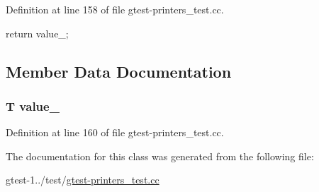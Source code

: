 \-Definition at line 158 of file gtest-\/printers\-\_\-test.\-cc.


\begin{DoxyCode}
{ return value_; }
\end{DoxyCode}


\subsection{\-Member \-Data \-Documentation}
\hypertarget{classfoo_1_1PrintableViaPrintToTemplate_ae496c0f6edafccdab7ef2e2b9d0c7e03}{
\subsubsection[{value\-\_\-}]{\setlength{\rightskip}{0pt plus 5cm}\-T {\bf value\-\_\-}}}\label{d4/d1d/classfoo_1_1PrintableViaPrintToTemplate_ae496c0f6edafccdab7ef2e2b9d0c7e03}


\-Definition at line 160 of file gtest-\/printers\-\_\-test.\-cc.



\-The documentation for this class was generated from the following file\-:\begin{DoxyCompactItemize}
\item 
gtest-\/1../test/\hyperlink{gtest-printers__test_8cc}{gtest-\/printers\-\_\-test.\-cc}\end{DoxyCompactItemize}
